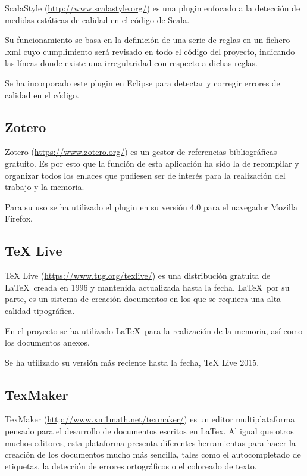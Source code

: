 ScalaStyle (\url{http://www.scalastyle.org/}) es una plugin enfocado a la detección de medidas estáticas de calidad en el código de Scala.

Su funcionamiento se basa en la definición de una serie de reglas en un fichero .xml cuyo cumplimiento será revisado en todo el código del proyecto, indicando las líneas donde existe una irregularidad con respecto a dichas reglas.

Se ha incorporado este plugin en Eclipse para detectar y corregir errores de calidad en el código.


\subsection{Zotero}
Zotero (\url{https://www.zotero.org/}) es un gestor de referencias bibliográficas gratuito. Es por esto que la función de esta aplicación ha sido la de recompilar y organizar todos los enlaces que pudiesen ser de interés para la realización del trabajo y la memoria.

Para su uso se ha utilizado el plugin en su versión 4.0 para el navegador Mozilla Firefox.

\subsection{TeX Live}
TeX Live (\url{https://www.tug.org/texlive/}) es una distribución gratuita de \LaTeX\ creada en 1996 y mantenida actualizada hasta la fecha. \LaTeX\, por su parte, es un sistema de creación documentos en los que se requiera una alta calidad tipográfica.

En el proyecto se ha utilizado \LaTeX\ para la realización de la memoria, así como los documentos anexos.

Se ha utilizado su versión más reciente hasta la fecha, TeX Live 2015.

\subsection{TexMaker}

TexMaker (\url{http://www.xm1math.net/texmaker/}) es un editor multiplataforma pensado para el desarrollo de documentos escritos en LaTex. Al igual que otros muchos editores, esta plataforma presenta diferentes herramientas para hacer la creación de los documentos mucho más sencilla, tales como el autocompletado de etiquetas, la detección de errores ortográficos o el coloreado de texto.

